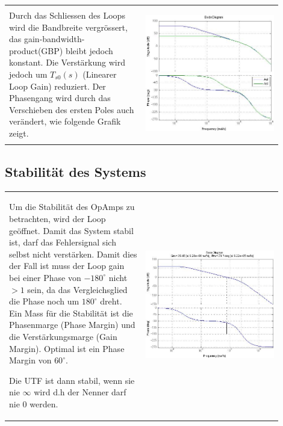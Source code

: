 \begin{tabular}{m{0.45\linewidth}m{0.45\linewidth}}
	Durch das Schliessen des Loops wird die Bandbreite vergrössert, das gain-bandwidth-product(GBP) bleibt jedoch konstant. Die Verstärkung wird jedoch um $T_{s0}(s)$ (Linearer Loop Gain) reduziert. Der Phasengang wird durch das Verschieben des ersten Poles auch verändert, wie folgende Grafik zeigt.
	& \begin{center}
        \includegraphics[width=6.7cm, valign=t]{./pictures/AolAcl.png}
    \end{center}
\end{tabular}
\vspace{-7mm}
\subsection{Stabilität des Systems}
\begin{tabular}{m{0.45\linewidth}m{0.45\linewidth}}
    Um die Stabilität des OpAmps zu betrachten, wird der Loop geöffnet. Damit das System stabil ist, darf das       
    Fehlersignal sich selbst nicht verstärken. Damit dies der Fall ist muss der Loop gain bei einer Phase von $-180^\circ$
    nicht $>1$ sein, da das Vergleichsglied die Phase noch um $180^\circ$ dreht. Ein Mass für die Stabilität ist die 
    Phasenmarge (Phase Margin) und die Verstärkungsmarge (Gain Margin). Optimal ist ein Phase Margin von $60^{\circ}$.
    
    Die UTF ist dann stabil, wenn sie nie $\infty$ wird d.h der Nenner darf nie 0 werden.
    & \begin{center}
        \includegraphics[width=6.7cm, valign=t]{./pictures/margins.png}
    \end{center}
\end{tabular}


